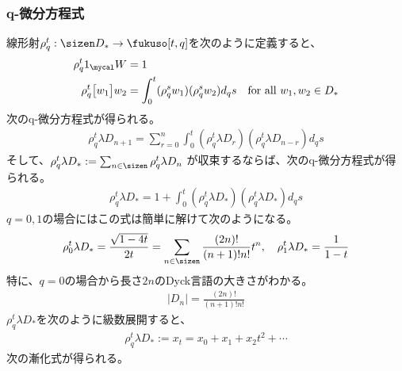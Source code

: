 {\subsubsection{q-微分方程式}\label{s3:q-微分方程式} %
	線形射$\rho^t_q:\sizen D_*\to\fukuso[t,q]$を次のように定義すると、
	\begin{equation*}\begin{split}
		\rho^t_q 1_\W &= 1 \\
		\rho^t_q \gdyck{w_1}w_2 &= \int_0^t (\rho^s_q w_1)(\rho^s_q w_2) d_qs
		\quad\text{for all } w_1,w_2\in D_*
	\end{split}\end{equation*}
	次のq-微分方程式が得られる。
	\begin{equation*}\begin{split}
		\rho^t_q \lambda D_{n+1} = \sum_{r=0}^n \int_0^t 
		(\rho^t_q\lambda D_r)(\rho^t_q\lambda D_{n-r}) d_qs
	\end{split}\end{equation*}
	そして、$\rho^t_q\lambda D_*:=\sum_{n\in\sizen} \rho^t_q\lambda D_n$
	が収束するならば、次のq-微分方程式が得られる。
	\begin{equation*}\begin{split}
		\rho^t_q\lambda D_* = 1 + \int_0^t 
		(\rho^t_q\lambda D_*)(\rho^t_q\lambda D_*) d_qs
	\end{split}\end{equation*}
	$q=0,1$の場合にはこの式は簡単に解けて次のようになる。
	\begin{equation*}\begin{split}
		\rho^t_0\lambda D_* = \frac{\sqrt{1-4t}}{2t} 
			= \sum_{n\in\sizen} \frac{(2n)!}{(n+1)!n!}t^n,\quad
		\rho^t_1\lambda D_* = \frac{1}{1-t}
	\end{split}\end{equation*}
	特に、$q=0$の場合から長さ$2n$のDyck言語の大きさがわかる。
	\begin{equation*}\begin{split}
		|D_n| = \frac{(2n)!}{(n+1)!n!}
	\end{split}\end{equation*}
	$\rho^t_q\lambda D_*$を次のように級数展開すると、
	\begin{equation*}\begin{split}
		\rho^t_q\lambda D_* := x_t = x_0 + x_1 + x_2t^2 + \cdots
	\end{split}\end{equation*}
	次の漸化式が得られる。
	\begin{equation*}\begin{split}

\end{split}
\end{equation*}}
